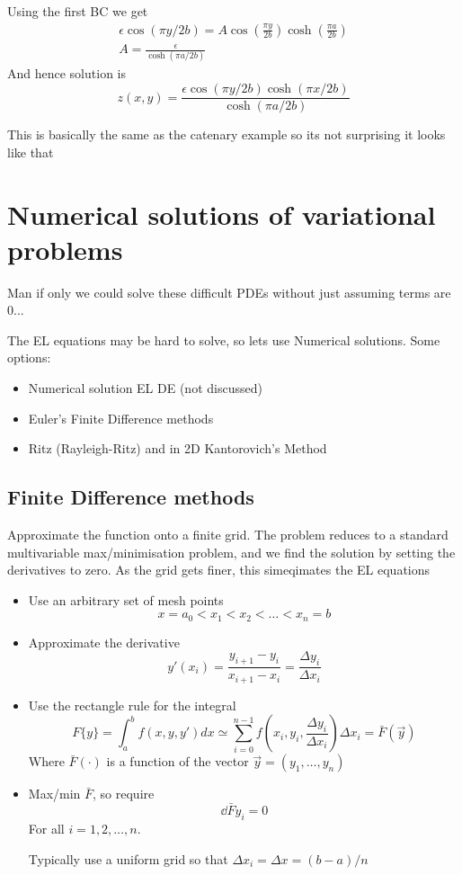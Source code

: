 \documentclass{X:/Documents/Coding/Latex/myassignment}
\begin{document}
Using the first BC we get
\begin{align*}
\epsilon \cos \left(\pi y/2b\right) = A \cos\left(\frac{\pi y}{2b}\right) \cosh\left(\frac{\pi a}{2b}\right)\\
A = \frac{\epsilon}{\cosh\left(\pi a /2b\right)}	
\end{align*}
And hence solution is
\[z(x,y) = \frac{\epsilon \cos(\pi y/2b) \cosh(\pi x/2b)}{\cosh\left(\pi a /2b\right)} \]


This is basically the same as the catenary example so its not surprising it looks like that

\section{Numerical solutions of variational problems}
Man if only we could solve these difficult PDEs without just assuming terms are 0...

The EL equations may be hard to solve, so lets use Numerical solutions.
Some options:
\begin{itemize}
	\item Numerical solution EL DE (not discussed)
	\item Euler's Finite Difference methods
	\item Ritz (Rayleigh-Ritz) and in 2D Kantorovich's Method
\end{itemize}

\subsection{Finite Difference methods}
Approximate the function onto a finite grid. The problem reduces to a standard multivariable max/minimisation problem, and we find the solution by setting the derivatives to zero. As the grid gets finer, this simeqimates the EL equations
\begin{itemize}
	\item Use an arbitrary set of mesh points
	\[x = a_0 < x_1 < x_2 <\ldots <x_n = b\]
	\item Approximate the derivative
	\[y'(x_i) = \frac{y_{i+1} - y_i}{x_{i+1} - x_i} = \frac{\Delta y_i}{\Delta x_i}\]
	\item Use the rectangle rule for the integral
	\[F\{y\} = \int_a^b f(x,y,y') dx \simeq \sum_{i=0}^{n-1} f\left(x_i,y_i,\frac{\Delta y_i}{\Delta x_i}\right) \Delta x_i = \bar{F}(\vec y)\]
	Where $\bar{F}(\cdot)$ is a function of the vector $\vec y = \left(y_1,\ldots,y_n\right)$
	\item Max/min $\bar{F}$, so require
	\[\dd{\bar{F}}{y_i} = 0\]
	For all $i=1,2,\ldots,n$.

	Typically use a uniform grid so that $\Delta x_i = \Delta x = (b-a)/n$
\end{itemize}
\end{document}

